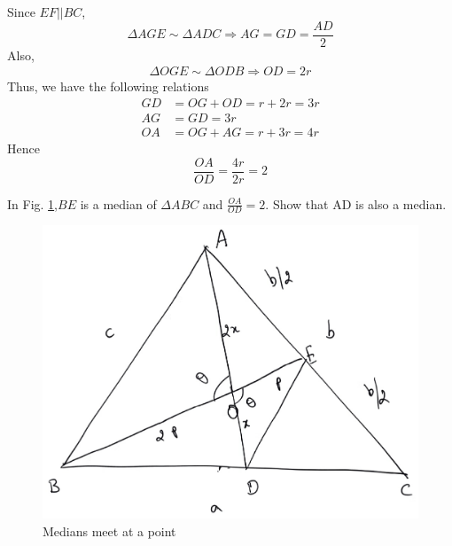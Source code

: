 \proof Since $EF || BC$,
%
\begin{equation}
\Delta AGE \sim \Delta ADC \Rightarrow AG = GD = \frac{AD}{2}
\end{equation}
%
Also,
\begin{align}
\Delta OGE \sim \Delta ODB \Rightarrow OD = 2r
\end{align}
Thus, we have the following relations
\begin{align}
GD &= OG + OD  = r + 2r = 3r\\
AG &= GD = 3r\\
OA &= OG + AG = r + 3r = 4r
\end{align}
Hence
%
\begin{equation}
\frac{OA}{OD} = \frac{4r}{2r} = 2
\end{equation}
%
%
\begin{problem}
	In Fig. \ref{ch2_median_final},$BE$ is a median of $\Delta ABC$ and $\frac{OA}{OD} = 2$.  Show that AD is also a median. 
\end{problem}
%
\begin{figure}[!h]
	\begin{center}
		
		\includegraphics[width=\columnwidth]{./figs/ch2_median_final}
		\vspace*{-10cm}
	\end{center}
	\caption{Medians meet at a point}
	\label{ch2_median_final}	
\end{figure}

